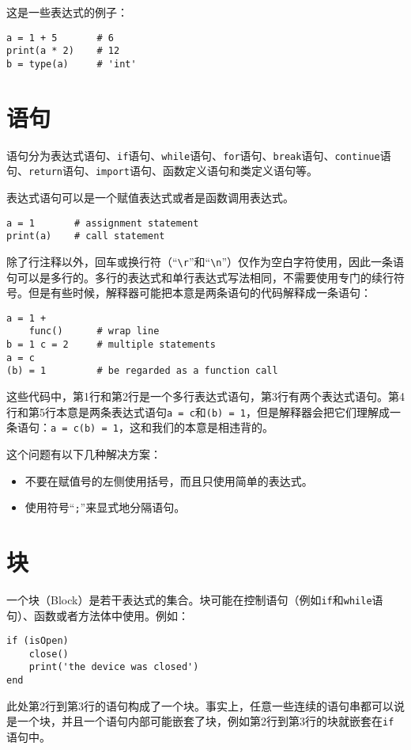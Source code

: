 这是一些表达式的例子：
\begin{lstlisting}[language=berry, numbers=none]
a = 1 + 5       # 6
print(a * 2)    # 12
b = type(a)     # 'int'
\end{lstlisting}

\section{语句}

语句分为表达式语句、\texttt{if}语句、\texttt{while}语句、\texttt{for}语句、\texttt{break}语句、\texttt{continue}语句、\texttt{return}语句、\texttt{import}语句、函数定义语句和类定义语句等。

表达式语句可以是一个赋值表达式或者是函数调用表达式。
\begin{lstlisting}[language=berry, numbers=none]
a = 1       # assignment statement
print(a)    # call statement
\end{lstlisting}

除了行注释以外，回车或换行符（``\texttt{\textbackslash r}''和``\texttt{\textbackslash n}''）仅作为空白字符使用，因此一条语句可以是多行的。多行的表达式和单行表达式写法相同，不需要使用专门的续行符号。但是有些时候，解释器可能把本意是两条语句的代码解释成一条语句：
\begin{lstlisting}[language=berry]
a = 1 +
    func()      # wrap line
b = 1 c = 2     # multiple statements
a = c
(b) = 1         # be regarded as a function call
\end{lstlisting}

这些代码中，第1行和第2行是一个多行表达式语句，第3行有两个表达式语句。第4行和第5行本意是两条表达式语句\texttt{a = c}和\texttt{(b) = 1}，但是解释器会把它们理解成一条语句：\texttt{a = c(b) = 1}，这和我们的本意是相违背的。

这个问题有以下几种解决方案：

\begin{itemize}
    \item 不要在赋值号的左侧使用括号，而且只使用简单的表达式。
    \item 使用符号``\texttt{;}''来显式地分隔语句。
\end{itemize}

\section{块}

一个块（Block）是若干表达式的集合。块可能在控制语句（例如\texttt{if}和\texttt{while}语句）、函数或者方法体中使用。例如：
\begin{lstlisting}[language=berry]
if (isOpen)
    close()
    print('the device was closed')
end
\end{lstlisting}

此处第2行到第3行的语句构成了一个块。事实上，任意一些连续的语句串都可以说是一个块，并且一个语句内部可能嵌套了块，例如第2行到第3行的块就嵌套在\texttt{if}语句中。
